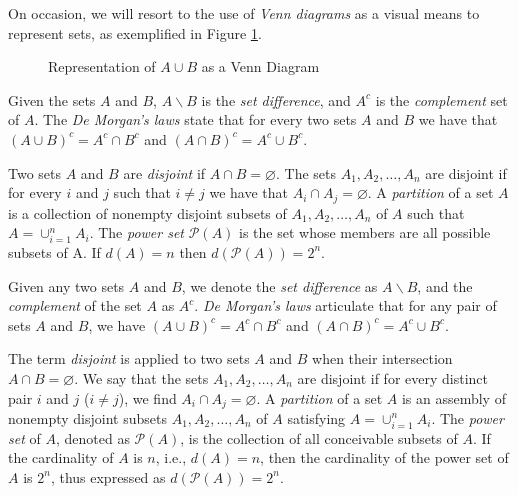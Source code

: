 On occasion, we will resort to the use of \emph{Venn diagrams} as a visual means to represent sets, as exemplified in Figure \ref{fig:Venn-diagram}.

\begin{figure}[t]
\centering
{}
\caption{\label{fig:Venn-diagram}Representation of $A \cup B$ as a Venn Diagram}
\end{figure}


Given the sets $A$ and $B$, $A \backslash B$ is the \emph{set difference}, and ${A}^c$ is the \emph{complement} set of $A$. The \emph{De Morgan's laws} state that for every two sets $A$ and $B$ we have that $\left( A \cup B \right)^c = A^c \cap B^c$ and $\left( A \cap B \right)^c = A^c \cup B^c$.

Two sets $A$ and $B$ are \emph{disjoint} if $A \cap B = \varnothing$. The sets $A_1, A_2, \ldots, A_n$ are disjoint if for every $i$ and $j$ such that $i \neq j$ we have that $A_i \cap A_j = \varnothing$. A \emph{partition} of a set $A$ is a collection of nonempty disjoint subsets of $A_1, A_2, \dots, A_n$ of $A$ such that  $A = \cup_{i=1}^n A_i$. The \emph{power set} $\mathcal{P}(A)$ is the set whose members are all possible subsets of A. If $d(A)=n$ then $d\left( \mathcal{P}(A) \right) = 2^n$.

Given any two sets $A$ and $B$, we denote the \emph{set difference} as $A \backslash B$, and the \emph{complement} of the set $A$ as ${A}^c$. \emph{De Morgan's laws} articulate that for any pair of sets $A$ and $B$, we have $\left( A \cup B \right)^c = A^c \cap B^c$ and $\left( A \cap B \right)^c = A^c \cup B^c$.

The term \emph{disjoint} is applied to two sets $A$ and $B$ when their intersection $A \cap B = \varnothing$. We say that the sets $A_1, A_2, \ldots, A_n$ are disjoint if for every distinct pair $i$ and $j$ ($i \neq j$), we find $A_i \cap A_j = \varnothing$. A \emph{partition} of a set $A$ is an assembly of nonempty disjoint subsets $A_1, A_2, \dots, A_n$ of $A$ satisfying  $A = \cup_{i=1}^n A_i$. The \emph{power set} of $A$, denoted as $\mathcal{P}(A)$, is the collection of all conceivable subsets of $A$. If the cardinality of $A$ is $n$, i.e., $d(A)=n$, then the cardinality of the power set of $A$ is $2^n$, thus expressed as $d\left( \mathcal{P}(A) \right) = 2^n$.

